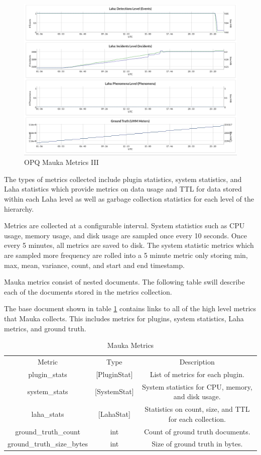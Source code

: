 \begin{figure}
	\centering
	\includegraphics[width=\linewidth]{figures/metrics_3.png}
	\caption{OPQ Mauka Metrics III}
	\label{fig:Metrics3}
\end{figure}

The types of metrics collected include plugin statistics, system statistics, and Laha statistics which provide metrics on data usage and TTL for data stored within each Laha level as well as garbage collection statistics for each level of the hierarchy.

Metrics are collected at a configurable interval. System statistics such as CPU usage, memory usage, and disk usage are sampled once every 10 seconds. Once every 5 minutes, all metrics are saved to disk. The system statistic metrics which are sampled more frequency are rolled into a 5 minute metric only storing min, max, mean, variance, count, and start and end timestamp.

Mauka metrics consist of nested documents. The following table swill describe each of the documents stored in the metrics collection.

The base document shown in table \ref{table:Metrics} contains links to all of the high level metrics that Mauka collects. This includes metrics for plugins, system statistics, Laha metrics, and ground truth.

\begin{table}[H]
	\centering
	\caption{Mauka Metrics}
	\begin{tabular}{|c|c|c|}
		\hline 
		Metric & Type & Description \\ 
		plugin\_stats & [PluginStat] & List of metrics for each plugin. \\
		\hline
		system\_stats & [SystemStat] & System statistics for CPU, memory, and disk usage. \\
		\hline
		laha\_stats & [LahaStat] & Statistics on count, size, and TTL for each collection. \\
		\hline
		ground\_truth\_count & int & Count of ground truth documents. \\
		\hline
		ground\_truth\_size\_bytes & int & Size of ground truth in bytes. \\
		\hline 
	\end{tabular} 
	\label{table:Metrics}
\end{table}

